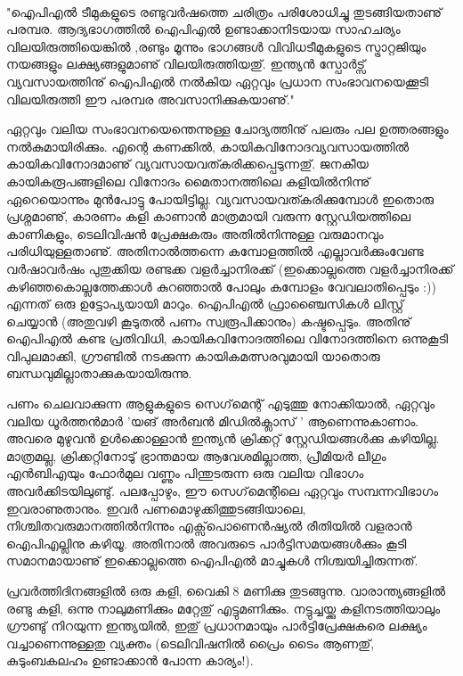 ﻿
\enlargethispage{2\baselineskip}

‌\begin{framed}
"ഐപിഎല്‍ ടീമുകളുടെ രണ്ടുവര്‍ഷത്തെ ചരിത്രം പരിശോധിച്ചു തുടങ്ങിയതാണു് പരമ്പര. ആദ്യഭാഗത്തില്‍ ഐപിഎല്‍ 
ഉണ്ടാക്കാനിടയായ സാഹചര്യം വിലയിരുത്തിയെങ്കില്‍ ,രണ്ടും മൂന്നും ഭാഗങ്ങള്‍ വിവിധടീമുകളുടെ സ്ട്രാറ്റജിയും നയങ്ങളും 
ലക്ഷ്യങ്ങളുമാണു് വിലയിരുത്തിയതു്. ഇന്ത്യന്‍ സ്പോര്‍ട്സ് വ്യവസായത്തിനു് ഐപിഎല്‍ നല്‍കിയ ഏറ്റവും 
പ്രധാന സംഭാവനയെക്കൂടി വിലയിരുത്തി ഈ പരമ്പര അവസാനിക്കുകയാണു്."
\end{framed}


ഏറ്റവും വലിയ സംഭാവനയെന്തെന്നുള്ള ചോദ്യത്തിനു് പലരും പല ഉത്തരങ്ങളും നല്‍കുമായിരിക്കും. എന്റെ കണക്കില്‍, 
കായികവിനോദവ്യവസായത്തില്‍ കായികവിനോദമാണു് വ്യവസായവത്കരിക്കപ്പെടുന്നതു്. ജനകീയ കായികരൂപങ്ങളിലെ 
വിനോദം മൈതാനത്തിലെ കളിയില്‍നിന്നു് ഏറെയൊന്നും മുന്‍പോട്ടു പോയിട്ടില്ല. വ്യവസായവത്കരിക്കുമ്പോള്‍ ഇതൊരു 
പ്രശ്നമാണു്, കാരണം കളി കാണാന്‍ മാത്രമായി വരുന്ന സ്റ്റേഡിയത്തിലെ കാണികളും, ടെലിവിഷന്‍ പ്രേക്ഷകരും അതില്‍നിന്നുള്ള വരുമാനവും പരിധിയുള്ളതാണു്. അതിനാല്‍ത്തന്നെ കമ്പോളത്തില്‍ എല്ലാവര്‍ക്കുംവേണ്ട വര്‍ഷാവര്‍ഷം പുതുക്കിയ രണ്ടക്ക വളര്‍ച്ചാനിരക്ക് 
(ഇക്കൊല്ലത്തെ വളര്‍ച്ചാനിരക്ക് കഴിഞ്ഞകൊല്ലത്തേക്കാള്‍ കുറഞ്ഞാല്‍ പോലും കമ്പോളം 
വേവലാതിപ്പെടും :)) എന്നത് ഒരു ഉട്ടോപ്യയായി മാറും. ഐപിഎല്‍ ഫ്രാഞ്ചൈസികള്‍ ലിസ്റ്റ് ചെയ്യാന്‍ (അതുവഴി കൂടുതല്‍ 
പണം സ്വരൂപിക്കാനും) കഷ്ടപ്പെടും. അതിനു് ഐപിഎല്‍ കണ്ട പ്രതിവിധി, കായികവിനോദത്തിലെ വിനോദത്തിനെ ഒന്നുകൂടി വിപുലമാക്കി, ഗ്രൗണ്ടില്‍ നടക്കുന്ന കായികമത്സരവുമായി യാതൊരു ബന്ധവുമില്ലാതാക്കുകയായിരുന്നു.

പണം ചെലവാക്കുന്ന ആളുകളുടെ സെഗ്‌മെന്റ് എടുത്തു നോക്കിയാല്‍, ഏറ്റവും വലിയ ധൂര്‍ത്തന്‍മാര്‍ 'യങ് അര്‍ബന്‍ 
മിഡില്‍ക്ലാസ് ' ആണെന്നുകാണാം. അവരെ മുഴുവന്‍ ഉള്‍ക്കൊള്ളാന്‍ ഇന്ത്യന്‍ ക്രിക്കറ്റ് സ്റ്റേഡിയങ്ങള്‍ക്കു കഴിയില്ല. മാത്രമല്ല, 
ക്രിക്കറ്റിനോടു് ഭ്രാന്തമായ ആവേശമില്ലാത്ത, പ്രീമിയര്‍ ലീഗും എന്‍ബിഎയും ഫോര്‍മുല വണ്ണും പിന്തുടരുന്ന ഒരു വലിയ വിഭാഗം 
അവര്‍ക്കിടയിലുണ്ടു്. പലപ്പോഴും, ഈ സെഗ്‌മെന്റിലെ ഏറ്റവും സമ്പന്നവിഭാഗം ഇവരാണുതാനും. ഇവര്‍ 
പണമൊഴുക്കിത്തുടങ്ങിയാലെ, നിശ്ചിതവരുമാനത്തില്‍നിന്നും എക്സ്‌പൊണെന്‍ഷ്യല്‍ രീതിയില്‍ വളരാന്‍ ഐപിഎല്ലിനു 
കഴിയൂ. അതിനാല്‍ അവരുടെ പാര്‍ട്ടിസമയങ്ങള്‍ക്കും കൂടി സമാനമായാണു് ഇക്കൊല്ലത്തെ ഐപിഎല്‍ മാച്ചുകള്‍ 
നിശ്ചയിച്ചിരുന്നത്.


പ്രവര്‍ത്തിദിനങ്ങളില്‍ ഒരു കളി, വൈകി 8 മണിക്കു തുടങ്ങുന്നു. വാരാന്ത്യങ്ങളില്‍ രണ്ടു കളി, ഒന്നു നാലുമണിക്കും മറ്റേതു് 
എട്ടുമണിക്കും. നട്ടുച്ചയ്ക്കു കളിനടത്തിയാലും ഗ്രൗണ്ടു് നിറയുന്ന ഇന്ത്യയില്‍, ഇതു് പ്രധാനമായും പാര്‍ട്ടിപ്രേക്ഷകരെ ലക്ഷ്യം 
വച്ചാണെന്നുള്ളതു വ്യക്തം (ടെലിവിഷനില്‍ പ്രൈം ടൈം ആണതു്, കുടുംബകലഹം ഉണ്ടാക്കാന്‍ പോന്ന കാര്യം!).

